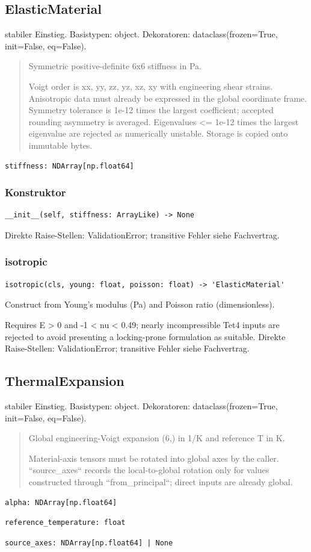 \subsection{ElasticMaterial}
stabiler Einstieg.
Basistypen: object. Dekoratoren: dataclass(frozen=True, init=False, eq=False).
\begin{quote}
Symmetric positive-definite 6x6 stiffness in Pa.\par Voigt order is xx, yy, zz, yz, xz, xy with engineering shear strains. Anisotropic data must already be expressed in the global coordinate frame. Symmetry tolerance is 1e-12 times the largest coefficient; accepted rounding asymmetry is averaged. Eigenvalues <= 1e-12 times the largest eigenvalue are rejected as numerically unstable. Storage is copied onto immutable bytes.
\end{quote}
\begin{lstlisting}
stiffness: NDArray[np.float64]
\end{lstlisting}
\subsubsection*{Konstruktor}
\begin{lstlisting}
__init__(self, stiffness: ArrayLike) -> None
\end{lstlisting}
Direkte Raise-Stellen: ValidationError; transitive Fehler siehe Fachvertrag.
\subsubsection*{isotropic}
\begin{lstlisting}
isotropic(cls, young: float, poisson: float) -> 'ElasticMaterial'
\end{lstlisting}
Construct from Young's modulus (Pa) and Poisson ratio (dimensionless).\par Requires E > 0 and -1 < nu < 0.49; nearly incompressible Tet4 inputs are rejected to avoid presenting a locking-prone formulation as suitable.
Direkte Raise-Stellen: ValidationError; transitive Fehler siehe Fachvertrag.
\subsection{ThermalExpansion}
stabiler Einstieg.
Basistypen: object. Dekoratoren: dataclass(frozen=True, init=False, eq=False).
\begin{quote}
Global engineering-Voigt expansion (6,) in 1/K and reference T in K.\par Material-axis tensors must be rotated into global axes by the caller. ``source\_axes`` records the local-to-global rotation only for values constructed through ``from\_principal``; direct inputs are already global.
\end{quote}
\begin{lstlisting}
alpha: NDArray[np.float64]
\end{lstlisting}
\begin{lstlisting}
reference_temperature: float
\end{lstlisting}
\begin{lstlisting}
source_axes: NDArray[np.float64] | None
\end{lstlisting}
